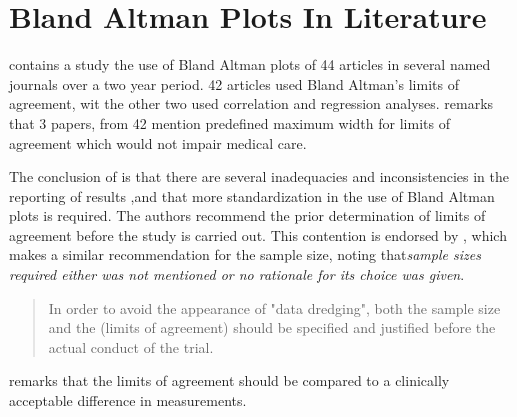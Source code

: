 \documentclass[MAIN.tex]{subfiles}
\begin{document}
\section{Bland Altman Plots In Literature}
\citet{mantha} contains a study the use of Bland Altman plots of
44 articles in several named journals over a two year period. 42
articles used Bland Altman's limits of agreement, wit the other
two used correlation and regression analyses. \citet{mantha}
remarks that 3 papers, from 42 mention predefined maximum width
for limits of agreement which would not impair medical care.

The conclusion of \citet{mantha} is that there are several
inadequacies and inconsistencies in the reporting of results ,and
that more standardization in the use of Bland Altman plots is
required. The authors recommend the prior determination of limits
of agreement before the study is carried out. This contention is
endorsed by \citet{lin}, which makes a similar recommendation for
the sample size, noting that\emph{sample sizes required either was
	not mentioned or no rationale for its choice was given}.

\begin{quote}
	In order to avoid the appearance of "data dredging", both the
	sample size and the (limits of agreement) should be specified and
	justified before the actual conduct of the trial. \citep{lin}
\end{quote}

\citet{Dewitte} remarks that the limits of agreement should be
compared to a clinically acceptable difference in measurements.


	
\end{document}
